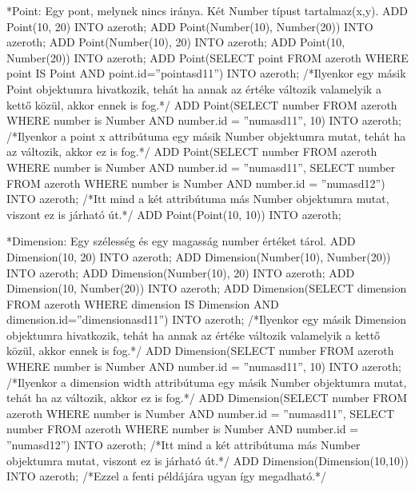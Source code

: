 *Point: Egy pont, melynek nincs iránya. Két Number típust tartalmaz(x,y).
ADD Point(10, 20) INTO azeroth;
ADD Point(Number(10), Number(20)) INTO azeroth;
ADD Point(Number(10), 20) INTO azeroth;
ADD Point(10, Number(20)) INTO azeroth;
ADD Point(SELECT point FROM azeroth WHERE point IS Point AND point.id=”pointasd11”) INTO azeroth; /*Ilyenkor egy másik Point objektumra hivatkozik, tehát ha annak az értéke változik valamelyik a kettő közül, akkor ennek is fog.*/
ADD Point(SELECT number FROM azeroth WHERE number is Number AND number.id = ”numasd11”, 10) INTO azeroth; /*Ilyenkor a point x attribútuma egy másik Number objektumra mutat, tehát ha az változik, akkor ez is fog.*/
ADD Point(SELECT number FROM azeroth WHERE number is Number AND number.id = ”numasd11”, SELECT number FROM azeroth WHERE number is Number AND number.id = ”numasd12”) INTO azeroth;  /*Itt mind a két attribútuma más Number objektumra mutat, viszont ez is járható út.*/
ADD Point(Point(10, 10)) INTO azeroth;


*Dimension: Egy szélesség és egy magasság number értéket tárol.
ADD Dimension(10, 20) INTO azeroth;
ADD Dimension(Number(10), Number(20)) INTO azeroth;
ADD Dimension(Number(10), 20) INTO azeroth;
ADD Dimension(10, Number(20)) INTO azeroth;
ADD Dimension(SELECT dimension FROM azeroth WHERE dimension IS Dimension AND dimension.id=”dimensionasd11”) INTO azeroth; /*Ilyenkor egy másik Dimension objektumra hivatkozik, tehát ha annak az értéke változik valamelyik a kettő közül, akkor ennek is fog.*/
ADD Dimension(SELECT number FROM azeroth WHERE number is Number AND number.id = ”numasd11”, 10) INTO azeroth; /*Ilyenkor a dimension width attribútuma egy másik Number objektumra mutat, tehát ha az változik, akkor ez is fog.*/
ADD Dimension(SELECT number FROM azeroth WHERE number is Number AND number.id = ”numasd11”, SELECT number FROM azeroth WHERE number is Number AND number.id = ”numasd12”) INTO azeroth;  /*Itt mind a két attribútuma más Number objektumra mutat, viszont ez is járható út.*/
ADD Dimension(Dimension(10,10)) INTO azeroth; /*Ezzel a fenti példájára ugyan így megadható.*/


